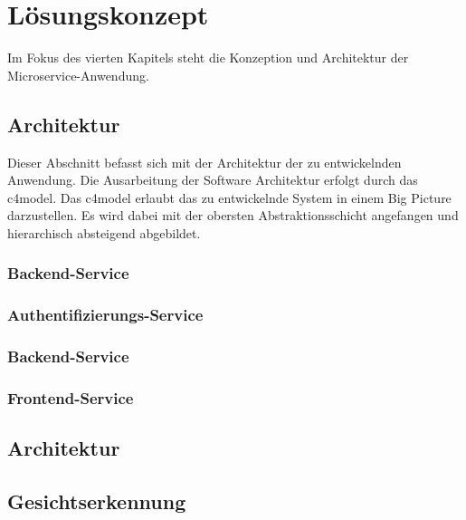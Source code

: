 \chapter{Lösungskonzept}
Im Fokus des vierten Kapitels steht die Konzeption und Architektur der Microservice-Anwendung.

\section{Architektur}
Dieser Abschnitt befasst sich mit der Architektur der zu entwickelnden Anwendung.
Die Ausarbeitung der Software Architektur erfolgt durch das c4model.
Das c4model erlaubt das zu entwickelnde System in einem Big Picture darzustellen.
Es wird dabei mit der obersten Abstraktionsschicht angefangen und hierarchisch absteigend abgebildet.


\subsection{Backend-Service}

\subsection{Authentifizierungs-Service}
\subsection{Backend-Service}
\subsection{Frontend-Service}
\section{Architektur}
\section{Gesichtserkennung}